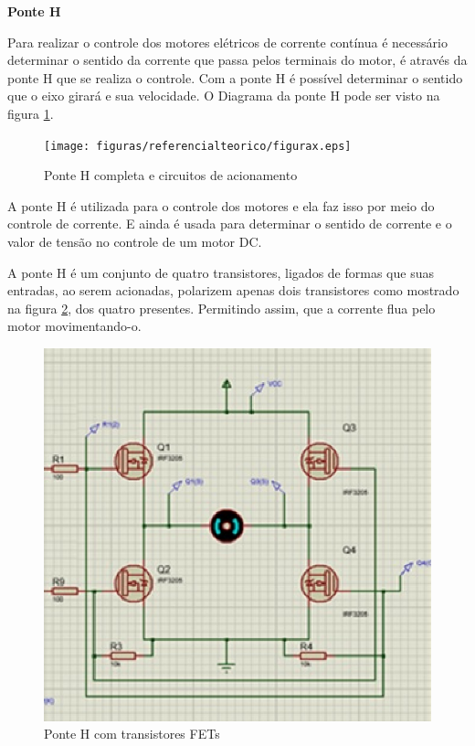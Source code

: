 \textbf{Ponte H}

Para realizar o controle dos motores elétricos de corrente contínua é necessário determinar o sentido da corrente que passa pelos terminais do motor, é através da ponte H que se realiza o controle. Com a ponte H é possível determinar o sentido que o eixo girará e sua velocidade. O Diagrama da ponte H pode ser visto na figura \ref{fig:ponteh}.

\begin{figure}[!htb]
	\centering
	\texttt{[image: figuras/referencialteorico/figurax.eps]}
	\caption{Ponte H completa e circuitos de acionamento}
	\label{fig:ponteh}
\end{figure}

A ponte H é utilizada para o controle dos motores e ela faz isso por meio do controle de corrente. E ainda é usada para determinar o sentido de corrente e o valor de tensão no controle de um motor DC.

A ponte H é um conjunto de quatro transistores, ligados de formas que suas entradas, ao serem acionadas, polarizem apenas dois transistores como mostrado na figura \ref{fig:ponteh_fets}, dos quatro presentes. Permitindo assim, que a corrente flua pelo motor movimentando-o.

\begin{figure}[!htb]
	\centering
	\includegraphics[keepaspectratio=true,scale=1]{figuras/referencialteorico/figurax_1.eps}
	\caption{Ponte H com transistores FETs}
	\label{fig:ponteh_fets}
\end{figure}

